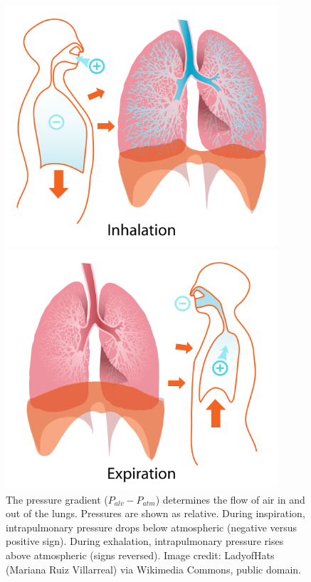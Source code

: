 \documentclass[12pt]{article}
\begin{document}
\begin{figure}[h!]
\begin{minipage}{.5\textwidth}
\centering
\includegraphics[width=0.9\textwidth]{images/inhalation.png}
\end{minipage}%
\begin{minipage}{.5\textwidth}
\centering
\includegraphics[width=0.9\textwidth]{images/exhalation.png}
\end{minipage}
\caption{The pressure gradient ($P_{alv}-P_{atm}$) determines the flow of air in and out of the lungs. Pressures are shown as relative. During inspiration, intrapulmonary pressure drops below atmospheric (negative versus positive sign). During exhalation, intrapulmonary pressure rises above atmospheric (signs reversed). Image credit: LadyofHats (Mariana Ruiz Villarreal) via Wikimedia Commons, public domain.}
\label{fig:pressures}
\end{figure}
\end{document}
